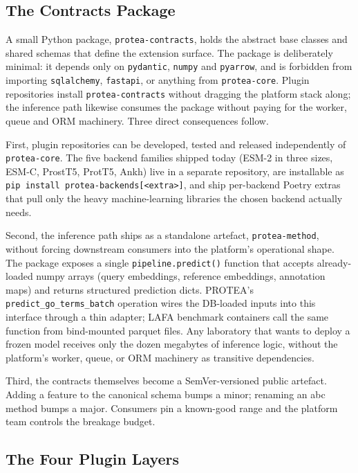 \subsection{The Contracts Package}
\label{subsec:contracts-package}

A small Python package, \texttt{protea-contracts}, holds the abstract base
classes and shared schemas that define the extension surface. The package
is deliberately minimal: it depends only on \texttt{pydantic},
\texttt{numpy} and \texttt{pyarrow}, and is forbidden from importing
\texttt{sqlalchemy}, \texttt{fastapi}, or anything from
\texttt{protea-core}. Plugin repositories install
\texttt{protea-contracts} without dragging the platform stack along; the
inference path likewise consumes the package without paying for the
worker, queue and ORM machinery. Three direct consequences follow.

First, plugin repositories can be developed, tested and released
independently of \texttt{protea-core}. The five backend families shipped today
(ESM-2 in three sizes, ESM-C, ProstT5, ProtT5, Ankh) live in a separate
repository, are installable as \texttt{pip install
protea-backends[<extra>]}, and ship per-backend Poetry extras that pull
only the heavy machine-learning libraries the chosen backend actually
needs.

Second, the inference path ships as a standalone artefact,
\texttt{protea-method}, without forcing downstream consumers into the
platform's operational shape. The package exposes a single
\texttt{pipeline.predict()} function that accepts already-loaded numpy
arrays (query embeddings, reference embeddings, annotation maps) and
returns structured prediction dicts. PROTEA's
\texttt{predict\_go\_terms\_batch} operation wires the DB-loaded inputs
into this interface through a thin adapter; LAFA benchmark containers
call the same function from bind-mounted parquet files. Any laboratory
that wants to deploy a frozen model receives only the dozen megabytes of
inference logic, without the platform's worker, queue, or ORM machinery
as transitive dependencies.

Third, the contracts themselves become a SemVer-versioned public artefact.
Adding a feature to the canonical schema bumps a minor; renaming an \gls{abc}
method bumps a major. Consumers pin a known-good range and the platform
team controls the breakage budget.

\subsection{The Four Plugin Layers}
\label{subsec:plugin-layers}

